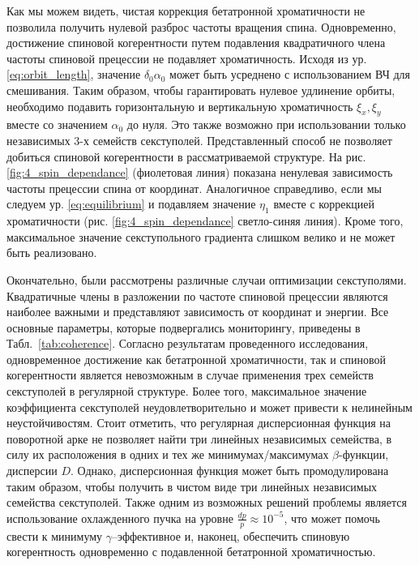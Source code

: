 \par Как мы можем видеть, чистая коррекция бетатронной хроматичности не позволила получить нулевой разброс частоты вращения спина. Одновременно, достижение спиновой когерентности путем подавления квадратичного члена частоты спиновой прецессии не подавляет хроматичность. Исходя из ур. \ref{eq:orbit_length}, значение $\delta_0\alpha_0$ может быть усреднено с использованием ВЧ для смешивания. Таким образом, чтобы гарантировать нулевое удлинение орбиты, необходимо подавить горизонтальную и вертикальную хроматичность $\xi_x,\xi_y$ вместе со значением $\alpha_0$ до нуля. Это также возможно при использовании только независимых 3-х семейств секступолей. Представленный способ не позволяет добиться спиновой когерентности в рассматриваемой структуре. На рис. \ref{fig:4_spin_dependance} (фиолетовая линия) показана ненулевая зависимость частоты прецессии спина от координат. Аналогичное справедливо, если мы следуем ур. \ref{eq:equilibrium} и подавляем значение $\eta_1$ вместе с коррекцией хроматичности (рис. \ref{fig:4_spin_dependance} светло-синяя линия). Кроме того, максимальное значение секступольного градиента слишком велико и не может быть реализовано.

\par Окончательно, были рассмотрены различные случаи оптимизации секступолями. Квадратичные члены в разложении по частоте спиновой прецессии являются наиболее важными и представляют зависимость от координат и энергии. Все основные параметры, которые подвергались мониторингу, приведены в Табл.~\ref{tab:coherence}. Согласно результатам проведенного исследования, одновременное достижение как бетатронной хроматичности, так и спиновой когерентности  является невозможным в случае применения трех семейств секступолей в регулярной структуре. Более того, максимальное значение коэффициента секступолей неудовлетворительно и может привести к нелинейным неустойчивостям. Стоит отметить, что регулярная дисперсионная функция на поворотной арке не позволяет найти три линейных независимых семейства, в силу их расположения в одних и тех же минимумах/максимумах $\beta$-функции, дисперсии $D$. Однако, дисперсионная функция может быть промодулирована таким образом, чтобы получить в чистом виде три линейных независимых семейства секступолей. Также одним из возможных решений проблемы является использование охлажденного пучка на уровне $\frac{dp}{p}\approx{10}^{-5}$, что может помочь свести к минимуму $\gamma$–эффективное и, наконец, обеспечить спиновую когерентность одновременно с подавленной бетатронной хроматичностью.

